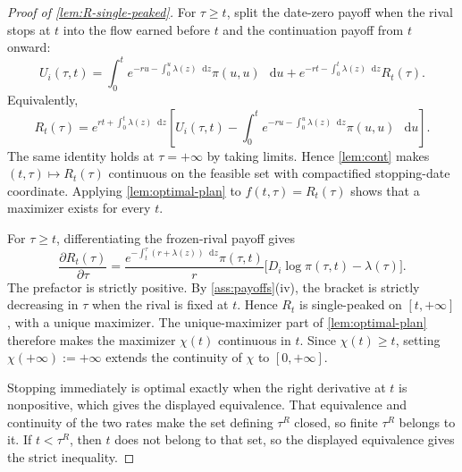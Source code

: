 \documentclass[12pt,reqno]{article}
\newcommand{\de}{\mathop{}\!\mathrm{d}}
\theoremstyle{definition} \newtheorem{example}{Example}
\theoremstyle{definition} \newtheorem{condition}{Condition}
\theoremstyle{definition} \newtheorem{corollary}{Corollary}
\theoremstyle{definition} \newtheorem{claim}{Claim}
\theoremstyle{definition} \newtheorem{definition}{Definition}
\theoremstyle{definition} \newtheorem{conjecture}{Conjecture}
\theoremstyle{definition} \newtheorem{Lemma}{Lemma}
\theoremstyle{definition} \newtheorem{lemma}{Lemma}
\theoremstyle{plain} \newtheorem{theorem}{Theorem}
\theoremstyle{definition} \newtheorem{assumption}{Assumption}
\theoremstyle{definition} \newtheorem*{assumptionnonumber}{Assumption}
\theoremstyle{definition} \newtheorem*{theoremNoNumber}{Proposition}
\theoremstyle{definition}
\theoremstyle{definition}\newtheorem{proposition}{Proposition}
\theoremstyle{definition} \newtheorem{result}{Result}
\theoremstyle{definition} \newtheorem*{definitionNoNumber}{Definition}
\theoremstyle{definition} \newtheorem{Definition}{Definition}
\theoremstyle{definition} \newtheorem*{DefinitionNoNumber}{Definition}
\theoremstyle{definition} \newtheorem*{fact}{Fact}
\theoremstyle{definition} \newtheorem*{property}{Property}
\theoremstyle{definition} \newtheorem{remark}{Remark}
\begin{document}
\begin{proof}[Proof of \cref{lem:R-single-peaked}]
For $\tau\ge t$, split the date-zero payoff when the rival stops at
$t$ into the flow earned before $t$ and the continuation payoff from
$t$ onward:
\[
U_i(\tau,t)
=
\int_0^t e^{-ru-\int_0^u\lambda(z)\de z}\pi(u,u)\,\de u
+
e^{-rt-\int_0^t\lambda(z)\de z}R_t(\tau).
\]
Equivalently,
\[
R_t(\tau)
=
e^{rt+\int_0^t\lambda(z)\de z}
\left[
U_i(\tau,t)
-
\int_0^t e^{-ru-\int_0^u\lambda(z)\de z}\pi(u,u)\,\de u
\right].
\]
The same identity holds at $\tau=+\infty$ by taking limits. Hence
\cref{lem:cont} makes $(t,\tau)\mapsto R_t(\tau)$ continuous on the
feasible set with compactified stopping-date coordinate. Applying
\cref{lem:optimal-plan} to $f(t,\tau)=R_t(\tau)$ shows that a maximizer
exists for every $t$.

For $\tau\geq t$, differentiating the frozen-rival payoff gives
\[
\frac{\partial R_t(\tau)}{\partial \tau}
=
\frac{e^{-\int_t^\tau(r+\lambda(z))\de z}\pi(\tau,t)}{r}
\Big[
D_i\log\pi(\tau,t)-\lambda(\tau)
\Big].
\]
The prefactor is strictly positive. By \cref{ass:payoffs}(iv), the bracket
is strictly decreasing in $\tau$ when the rival is fixed at $t$. Hence
$R_t$ is single-peaked on $[t,+\infty]$, with a unique maximizer. The
unique-maximizer part of \cref{lem:optimal-plan} therefore makes the
maximizer $\chi(t)$ continuous in $t$. Since $\chi(t)\ge t$,
setting $\chi(+\infty):=+\infty$ extends the continuity of $\chi$ to $[0,+\infty]$. 

Stopping immediately is optimal exactly when the right derivative at $t$
is nonpositive, which gives the displayed equivalence. That equivalence
and continuity of the two rates make the set defining $\tau^R$ closed, so
finite $\tau^R$ belongs to it. If $t<\tau^R$, then $t$ does not belong to
that set, so the displayed equivalence gives the strict inequality.
\end{proof}
\end{document}
